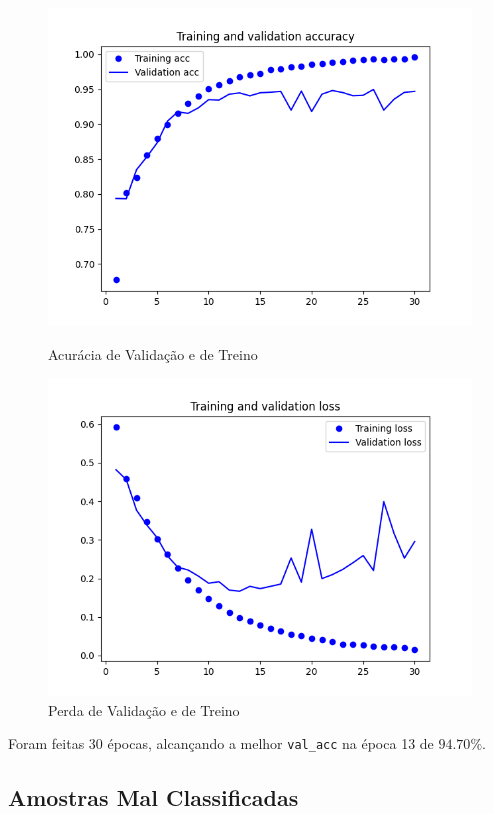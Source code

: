 \begin{figure}[H]
    \centering
    \includegraphics[width=\textwidth]{imgs/Test_5/5/train_test_acc.png}
    \caption{Acurácia de Validação e de Treino}
    \includegraphics[width=\textwidth]{imgs/Test_5/5/train_test_loss.png}
    \caption{Perda de Validação e de Treino}
    \label{fig:sub2}
\end{figure}

Foram feitas 30 épocas, alcançando a melhor \texttt{val\_acc} na época 13 de \(94.70\%\).

\subsection{Amostras Mal Classificadas}

